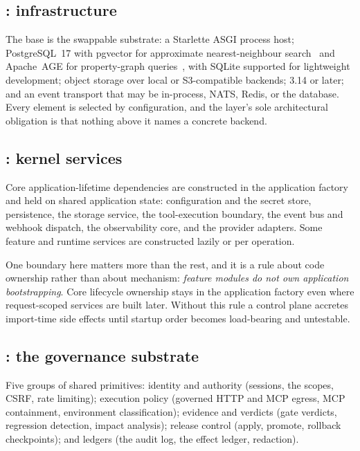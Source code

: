 \subsection{: infrastructure}

The base is the swappable substrate: a Starlette ASGI process host; PostgreSQL~17
with pgvector for approximate nearest-neighbour search~\cite{pgvector,malkov2020hnsw}
and Apache~AGE for property-graph queries~\cite{apacheage}, with SQLite supported
for lightweight development; object storage over local or S3-compatible backends;
\mlflow{} 3.14 or later; and an event transport that may be in-process, NATS,
Redis, or the database. Every element is selected by configuration, and the layer's
sole architectural obligation is that nothing above it names a concrete backend.

\subsection{: kernel services}

Core application-lifetime dependencies are constructed in the application factory
and held on shared application state: configuration and the secret store,
persistence, the storage service, the tool-execution boundary, the event bus and
webhook dispatch, the observability core, and the provider adapters. Some feature
and runtime services are constructed lazily or per operation.

One boundary here matters more than the rest, and it is a rule about code
ownership rather than about mechanism: \emph{feature modules do not own
application bootstrapping}. Core lifecycle ownership stays in the application
factory even where request-scoped services are built later. Without this rule a
control plane accretes import-time side effects until startup order becomes
load-bearing and untestable.

\subsection{: the governance substrate}

Five groups of shared primitives: identity and authority (sessions, the
\statScopesW{} scopes, CSRF, rate limiting); execution policy (governed HTTP and MCP
egress, MCP containment, environment classification); evidence and verdicts (gate
verdicts, regression detection, impact analysis); release control (apply, promote,
rollback checkpoints); and ledgers (the audit log, the effect ledger, redaction).

